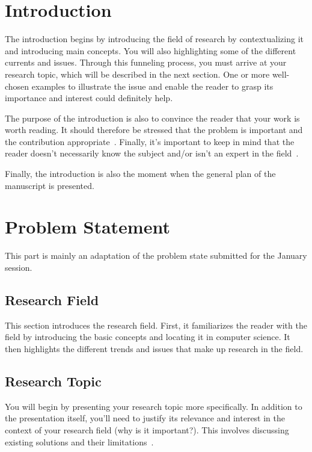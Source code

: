 \section{Introduction}

The introduction begins by introducing the field of research by contextualizing it and introducing main concepts. You will also highlighting some of the different currents and issues. Through this funneling process, you must arrive at your research topic, which will be described in the next section. One or more well-chosen examples to illustrate the issue and enable the reader to grasp its importance and interest could definitely help.

The purpose of the introduction is also to convince the reader that your work is worth reading. It should therefore be stressed that the problem is important and the contribution appropriate~\cite{melot2008elements}.
Finally, it's important to keep in mind that the reader doesn't necessarily know the subject and/or isn't an expert in the field~\cite{melot2008elements}.

Finally, the introduction is also the moment when the general plan of the manuscript is presented.

\section{Problem Statement}

This part is mainly an adaptation of the problem state submitted for the January session.

\subsection{Research Field}

This section introduces the research field. First, it familiarizes the reader with the field by introducing the basic concepts and locating it in computer science. It then highlights the different trends and issues that make up research in the field.

\subsection{Research Topic}

You will begin by presenting your research topic more specifically. In addition to the presentation itself, you'll need to justify its relevance and interest in the context of your research field (why is it important?). This involves discussing existing solutions and their limitations~\cite{melot2008elements}.


